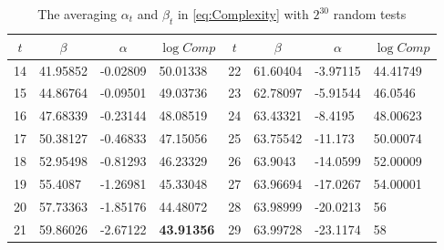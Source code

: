 \begin{table}[htbp]
  \centering
  \caption{The averaging $\alpha_t$ and $\beta_t$ in \eqref{eq:Complexity} with $2^{30}$ random tests}\label{tab:AlphaAndBeta}
    \begin{tabular}{|l|l|l|l|l|l|l|l|}
    \hline
    \multicolumn{1}{|c|}{$t$} & \multicolumn{1}{c|}{$\beta$} & \multicolumn{1}{c|}{$\alpha$} & \multicolumn{1}{c|}{$\log Comp$} & \multicolumn{1}{c|}{$t$} & \multicolumn{1}{c|}{$\beta$} & \multicolumn{1}{c|}{$\alpha$} & \multicolumn{1}{c|}{$\log Comp$} \\
    \hline

    14    & 41.95852 & -0.02809 & 50.01338 & 22    & 61.60404 & -3.97115 & 44.41749 \\
    \hline
    15    & 44.86764 & -0.09501 & 49.03736 & 23    & 62.78097 & -5.91544 & 46.0546 \\
    \hline
    16    & 47.68339 & -0.23144 & 48.08519 & 24    & 63.43321 & -8.4195 & 48.00623 \\
    \hline
    17    & 50.38127 & -0.46833 & 47.15056 & 25    & 63.75542 & -11.173 & 50.00074 \\
    \hline
    18    & 52.95498 & -0.81293 & 46.23329 & 26    & 63.9043 & -14.0599 & 52.00009 \\
    \hline
    19    & 55.4087 & -1.26981 & 45.33048 & 27    & 63.96694 & -17.0267 & 54.00001 \\
    \hline
    20    & 57.73363 & -1.85176 & 44.48072 & 28    & 63.98999 & -20.0213 & 56 \\
    \hline
    21    & 59.86026 & -2.67122 & \textbf{43.91356} & 29    & 63.99728 & -23.1174 & 58 \\
    \hline

    \end{tabular}%
  \label{tab:Example1}%
\end{table}%


